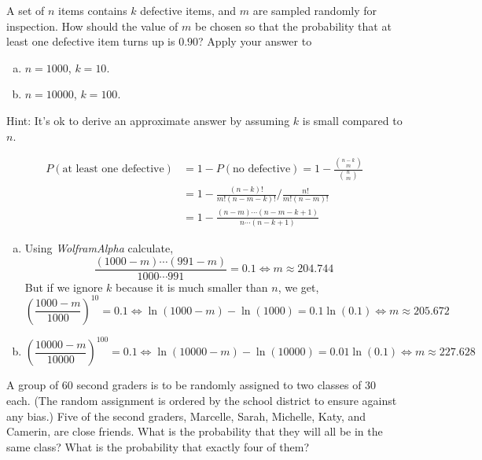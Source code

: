\documentclass[12pt]{elegantbook}
\begin{document}
    \begin{exercise*}[2]
        A set of $n$ items contains $k$ defective items, and $m$ are sampled randomly for inspection. How should the value of $m$ be chosen so that the probability that at least one defective item turns up is $0.90$? Apply your answer to 
        \begin{enumerate}[(a)]
            \item $n=1000$, $k=10$. 
            \item $n=10000$, $k=100$.
        \end{enumerate}
        Hint: It's ok to derive an approximate answer by assuming $k$ is small compared to $n$. 
    \end{exercise*}

    \begin{solution}
        \begin{align*}
            P(\text{at least one defective})&=1-P(\text{no defective})=1-\frac{\binom{n-k}{m}}{\binom{n}{m}}\\
            &=1-\frac{(n-k)!}{m!(n-m-k)!}\big/\frac{n!}{m!(n-m)!}\\
            &=1-\frac{(n-m)\cdots(n-m-k+1)}{n\cdots(n-k+1)}
        \end{align*}
        \begin{enumerate}[(a)]
            \item Using \emph{WolframAlpha} calculate, 
            \[\frac{(1000-m)\cdots(991-m)}{1000\cdots991}=0.1\Leftrightarrow m\approx 204.744 \]
            But if we ignore $k$ because it is much smaller than $n$, we get,
            \[
                \left(\frac{1000-m}{1000}\right)^{10}=0.1\Leftrightarrow \ln(1000-m)-\ln(1000)=0.1\ln(0.1)\Leftrightarrow m\approx 205.672
            \]
            \item \[
                \left(\frac{10000-m}{10000}\right)^{100}=0.1\Leftrightarrow \ln(10000-m)-\ln(10000)=0.01\ln(0.1)\Leftrightarrow m\approx 227.628
            \]
        \end{enumerate}
    \end{solution}

    \begin{exercise*}[3]
        A group of $60$ second graders is to be randomly assigned to two classes of $30$ each. (The random assignment is ordered by the school district to ensure against any bias.) Five of the second graders, Marcelle, Sarah, Michelle, Katy, and Camerin, are close friends. What is the probability that they will all be in the same class? What is the probability that exactly four of them? 
    \end{exercise*}
\end{document}

